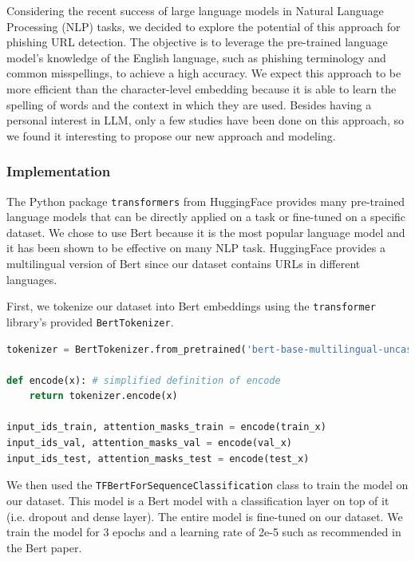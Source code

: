 \documentclass{article}
\begin{document}
    Considering the recent success of large language models in Natural Language Processing (NLP) tasks, we decided to explore the potential of this approach for phishing URL detection. The objective is to leverage the pre-trained language model's knowledge of the English language, such as phishing terminology and common misspellings, to achieve a high accuracy. We expect this approach to be more efficient than the character-level embedding because it is able to learn the spelling of words and the context in which they are used. Besides having a personal interest in LLM, only a few studies have been done on this approach, so we found it interesting to propose our new approach and modeling.

    \subsubsection{Implementation}

    The Python package \texttt{transformers} from HuggingFace provides many pre-trained language models that can be directly applied on a task or fine-tuned on a specific dataset. We chose to use Bert because it is the most popular language model and it has been shown to be effective on many NLP task. HuggingFace provides a multilingual version of Bert since our dataset contains URLs in different languages.

    First, we tokenize our dataset into Bert embeddings using the \texttt{transformer} library's provided \texttt{BertTokenizer}.

    \begin{lstlisting}[language=Python, caption=Tokenizing using Bert]
tokenizer = BertTokenizer.from_pretrained('bert-base-multilingual-uncased')

def encode(x): # simplified definition of encode
    return tokenizer.encode(x)

input_ids_train, attention_masks_train = encode(train_x)
input_ids_val, attention_masks_val = encode(val_x)
input_ids_test, attention_masks_test = encode(test_x)
    \end{lstlisting}

    We then used the \texttt{TFBertForSequenceClassification} class to train the model on our dataset. This model is a Bert model with a classification layer on top of it (i.e. dropout and dense layer). The entire model is fine-tuned on our dataset. We train the model for 3 epochs and a learning rate of 2e-5 such as recommended in the Bert paper\cite{devlin2018bert}.
\end{document}
